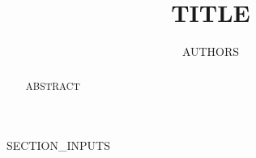 \documentclass[11pt]{article}
\title{{{TITLE}}}
\author{{{AUTHORS}}}
\date{}
\begin{document}
\maketitle

\begin{abstract}
{{ABSTRACT}}
\end{abstract}

{{SECTION_INPUTS}}


% 
\end{document}
